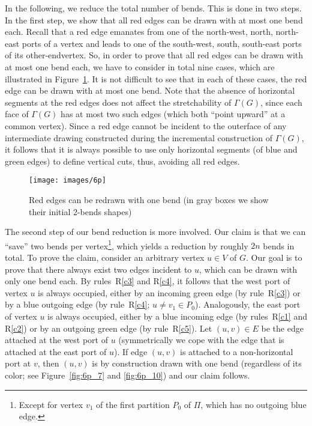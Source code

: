 \documentclass[a4paper,twoside,11pt]{article}
\begin{document}
In the following, we reduce the total number of bends. This is done
in two steps. In the first step, we show that all red edges can be
drawn with at most one bend each. Recall that a red edge emanates
from one of the north-west, north, north-east ports of a vertex and
leads to one of the south-west, south, south-east ports of its
other-endvertex. So, in order to prove that all red edges can be
drawn with at most one bend each, we have to consider in total nine
cases, which are illustrated in Figure~\ref{fig:rededges}. It is not
difficult to see that in each of these cases, the red edge can be
drawn with at most one bend. Note that the absence of horizontal
segments at the red edges does not affect the stretchability of
$\Gamma(G)$, since each face of $\Gamma(G)$ has at most two such
edges (which both ``point upward'' at a common vertex). Since a red
edge cannot be incident to the outerface of any intermediate drawing
constructed during the incremental construction of $\Gamma(G)$, it
follows that it is always possible to use only horizontal segments
(of blue and green edges) to define vertical cuts, thus, avoiding all
red edges.

\begin{figure}[t!]
    \centering
    \texttt{[image: images/6p]} 
    \caption{Red edges can be redrawn with one bend (in gray boxes we show their initial 2-bends shapes)}
    \label{fig:rededges}  
\end{figure} 

The second step of our bend reduction is more involved. Our claim is
that we can ``save'' two bends per vertex\footnote{Except for vertex
$v_1$ of the first partition $P_0$ of $\Pi$, which has no outgoing
blue edge.}, which yields a reduction by roughly $2n$ bends in
total. To prove the claim, consider an arbitrary vertex $u \in V$ of
$G$. Our goal is to prove that there always exist two edges incident
to $u$, which can be drawn with only one bend each. By
rules~R\ref{c3} and R\ref{c4}, it follows that the west port of
vertex $u$ is always occupied, either by an incoming green edge (by
rule~R\ref{c3}) or by a blue outgoing edge (by rule~R\ref{c4}; $u
\neq v_1 \in P_0$). Analogously, the east port of vertex $u$ is
always occupied, either by a blue incoming edge (by rules~R\ref{c1}
and R\ref{c2}) or by an outgoing green edge (by rule~R\ref{c5}). Let
$(u,v) \in E$ be the edge attached at the west port of $u$
(symmetrically we cope with the edge that is attached at the east
port of $u$). If edge $(u,v)$ is attached to a non-horizontal port
at $v$, then $(u,v)$ is by construction drawn with one bend
(regardless of its color; see Figure~\ref{fig:6p_7} and
\ref{fig:6p_10}) and our claim follows.
\end{document}

